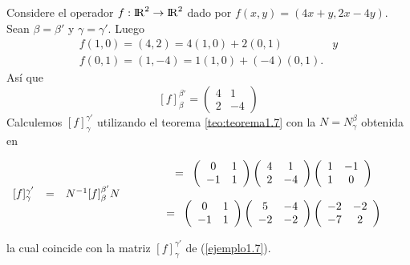     	\begin{ejem}  Considere el operador $ f : {\rm I\!R}^{2} \rightarrow {\rm I\!R}^{2}$ dado por  $ f (x, y) =
    	(4x + y, 2x - 4y) $. Sean $ \beta = \beta'  $ y $ \gamma = \gamma' $. Luego
    	\[\begin{array}{cc} 
    	f (1, 0) = (4, 2) = 4(1, 0) + 2(0, 1)  & y \\
    	f (0, 1) = (1, - 4) = 1(1, 0) + (-4)(0, 1).
    	\end{array} \] 
    	Así que
    	\[[f]_{\beta}^{\beta'}= \left(\begin{array}{cc} 
    	4 & 1 \\ 2 & -4
    	\end{array}\right) \]
    	Calculemos $ [f]_{\gamma}^{\gamma'} $
    	utilizando el teorema  \ref{teo:teorema1.7} con la $ N = N_{\gamma}^{\beta} $ obtenida en %
    	
    $\begin{array}{ccc}
    		[f]_{\gamma}^{\gamma'}&=&
    		N^{-1}[f]_{\beta}^{\beta'}N 
    \end{array}\\
    \begin{array}{c}
    \hspace{1.1cm}
    =\begin{array}{ccc}
    \left(\begin{array}{cc}
    0 & 1 \\ -1 & 1
    \end{array}\right)
    \left(\begin{array}{cc}
    4 & 1 \\ 2 & -4
    \end{array}\right)
    \left(\begin{array}{cc}
    1 & -1 \\ 1 & 0
    \end{array}\right)
    \end{array} 
    \\ \\
    \hspace{1.1cm}
    =\begin{array}{ccc}
    \left(\begin{array}{cc}
    0 & 1 \\ -1 & 1
    \end{array}\right)
    \left(\begin{array}{cc}
    5 & -4 \\ -2 & -2
    \end{array}\right)
    \left(\begin{array}{cc}
    -2 & -2 \\ -7 & 2
    \end{array}\right)
    \end{array} 
    \end{array}
    $
    \end{ejem}
    la cual coincide con la matriz $ [f]_{\gamma}^{\gamma'} $ de (\ref{ejemplo1.7}).
